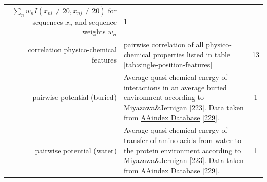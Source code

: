 \documentclass[11pt,a4paper,twoside]{book}
\theoremstyle{definition}
\theoremstyle{definition}
\theoremstyle{remark}
\begin{document}
\begin{longtable}[]{@{}rlc@{}}
\begin{minipage}[t]{0.50\columnwidth}
\(\sum_n w_n I(x_{ni} \! \neq \! 20, x_{nj} \! \neq \! 20)\) for
sequences \(x_n\) and sequence weights \(w_n\)\strut
\end{minipage} & \begin{minipage}[t]{0.18\columnwidth}\centering\strut
1\strut
\end{minipage}\tabularnewline
\begin{minipage}[t]{0.23\columnwidth}\raggedleft\strut
correlation physico-chemical features\strut
\end{minipage} & \begin{minipage}[t]{0.50\columnwidth}\raggedright\strut
pairwise correlation of all physico-chemical properties listed in table
\ref{tab:single-position-features}\strut
\end{minipage} & \begin{minipage}[t]{0.18\columnwidth}\centering\strut
13\strut
\end{minipage}\tabularnewline
\begin{minipage}[t]{0.23\columnwidth}\raggedleft\strut
pairwise potential (buried)\strut
\end{minipage} & \begin{minipage}[t]{0.50\columnwidth}\raggedright\strut
Average quasi-chemical energy of interactions in an average buried
environment according to Miyazawa\&Jernigan
{[}\protect\hyperlink{ref-Miyazawa1999a}{223}{]}. Data taken from
\href{http://www.genome.jp/dbget-bin/www_bget?aaindex:MIYS990107}{AAindex
Database} {[}\protect\hyperlink{ref-Kawashima2008}{229}{]}.\strut
\end{minipage} & \begin{minipage}[t]{0.18\columnwidth}\centering\strut
1\strut
\end{minipage}\tabularnewline
\begin{minipage}[t]{0.23\columnwidth}\raggedleft\strut
pairwise potential (water)\strut
\end{minipage} & \begin{minipage}[t]{0.50\columnwidth}\raggedright\strut
Average quasi-chemical energy of transfer of amino acids from water to
the protein environment according to Miyazawa\&Jernigan
{[}\protect\hyperlink{ref-Miyazawa1999a}{223}{]}. Data taken from
\href{http://www.genome.jp/dbget-bin/www_bget?aaindex:MIYS990106}{AAindex
Database} {[}\protect\hyperlink{ref-Kawashima2008}{229}{]}.\strut
\end{minipage} & \begin{minipage}[t]{0.18\columnwidth}\centering\strut
1\strut
\end{minipage}\tabularnewline

\end{longtable}
\end{document}
